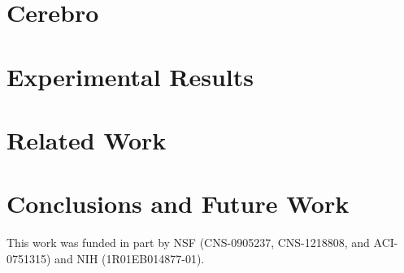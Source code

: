\documentclass[preprint,10pt]{sigplanconf}
\begin{document}
\section{Cerebro}
\label{sec:design}
%


%

\section{Experimental Results}
\label{sec:results}


\section{Related Work}
\label{sec:related_work}


\section{Conclusions and Future Work}
\label{sec:conclusions}




\vspace{-0.1in}
\acks
This work was funded in part by NSF (CNS-0905237, CNS-1218808, and ACI-0751315) and NIH
(1R01EB014877-01).







\end{document}
